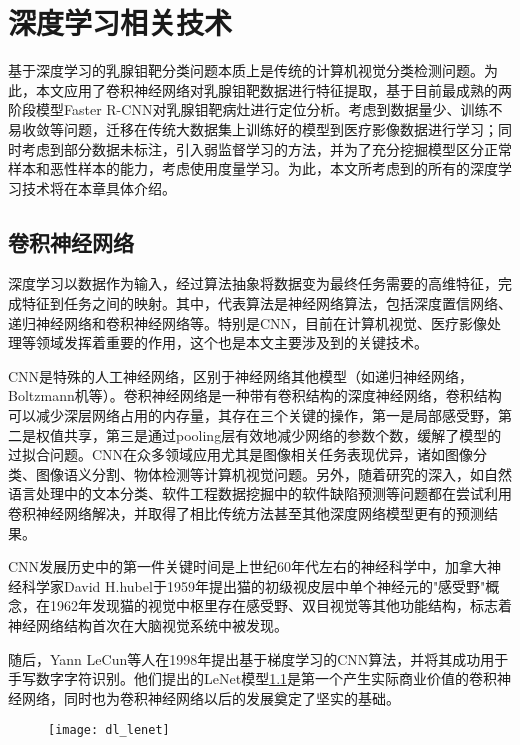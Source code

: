 \chapter{深度学习相关技术}\label{chap:dl}
基于深度学习的乳腺钼靶分类问题本质上是传统的计算机视觉分类检测问题。为此，本文应用了卷积神经网络对乳腺钼靶数据进行特征提取，基于目前最成熟的两阶段模型Faster R-CNN对乳腺钼靶病灶进行定位分析。考虑到数据量少、训练不易收敛等问题，迁移在传统大数据集上训练好的模型到医疗影像数据进行学习；同时考虑到部分数据未标注，引入弱监督学习的方法，并为了充分挖掘模型区分正常样本和恶性样本的能力，考虑使用度量学习。为此，本文所考虑到的所有的深度学习技术将在本章具体介绍。
\section{卷积神经网络}
深度学习以数据作为输入，经过算法抽象将数据变为最终任务需要的高维特征，完成特征到任务之间的映射。其中，代表算法是神经网络算法，包括深度置信网络、递归神经网络和卷积神经网络等。特别是CNN，目前在计算机视觉、医疗影像处理等领域发挥着重要的作用，这个也是本文主要涉及到的关键技术。

CNN是特殊的人工神经网络，区别于神经网络其他模型（如递归神经网络，Boltzmann机等）。卷积神经网络是一种带有卷积结构的深度神经网络，卷积结构可以减少深层网络占用的内存量，其存在三个关键的操作，第一是局部感受野，第二是权值共享，第三是通过pooling层有效地减少网络的参数个数，缓解了模型的过拟合问题。CNN在众多领域应用尤其是图像相关任务表现优异，诸如图像分类、图像语义分割、物体检测等计算机视觉问题。另外，随着研究的深入，如自然语言处理中的文本分类、软件工程数据挖掘中的软件缺陷预测等问题都在尝试利用卷积神经网络解决，并取得了相比传统方法甚至其他深度网络模型更有的预测结果。

CNN发展历史中的第一件关键时间是上世纪60年代左右的神经科学中，加拿大神经科学家David H.hubel于1959年提出猫的初级视皮层中单个神经元的"感受野"概念，在1962年发现猫的视觉中枢里存在感受野、双目视觉等其他功能结构，标志着神经网络结构首次在大脑视觉系统中被发现\cite{38Ba2013Do}。

随后，Yann LeCun等人在1998年提出基于梯度学习的CNN算法\cite{39lecun1998gradient}，并将其成功用于手写数字字符识别。他们提出的LeNet模型\ref{fig:dl_lenet}是第一个产生实际商业价值的卷积神经网络，同时也为卷积神经网络以后的发展奠定了坚实的基础。 
\begin{figure}[!htbp]
    \centering
    \texttt{[image: dl\_lenet]}
    \label{fig:dl_lenet}
\end{figure}

